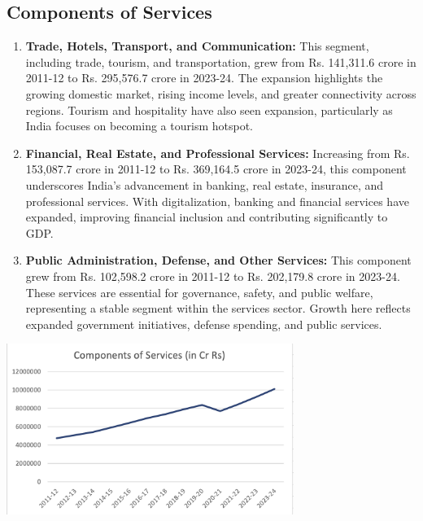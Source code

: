 \documentclass[a4paper,12pt]{extarticle} %
\begin{document}
\subsection{Components of Services}
\begin{enumerate}
    \item \textbf{Trade, Hotels, Transport, and Communication:} This segment, including trade, tourism, and transportation, grew from Rs. 141,311.6 crore in 2011-12 to Rs. 295,576.7 crore in 2023-24. The expansion highlights the growing domestic market, rising income levels, and greater connectivity across regions. Tourism and hospitality have also seen expansion, particularly as India focuses on becoming a tourism hotspot.
    
    \item \textbf{Financial, Real Estate, and Professional Services:} Increasing from Rs. 153,087.7 crore in 2011-12 to Rs. 369,164.5 crore in 2023-24, this component underscores India’s advancement in banking, real estate, insurance, and professional services. With digitalization, banking and financial services have expanded, improving financial inclusion and contributing significantly to GDP.
    
    \item \textbf{Public Administration, Defense, and Other Services:} This component grew from Rs. 102,598.2 crore in 2011-12 to Rs. 202,179.8 crore in 2023-24. These services are essential for governance, safety, and public welfare, representing a stable segment within the services sector. Growth here reflects expanded government initiatives, defense spending, and public services.
\end{enumerate}

\begin{center}
    \includegraphics[width=0.7\textwidth]{Q2/5.png} 
\end{center}\\

\\
\end{document}
